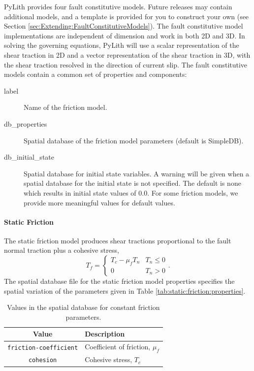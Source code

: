 PyLith provides four fault constitutive models. Future releases may
contain additional models, and a template is provided for you to construct
your own (see Section \vref{sec:Extending:FaultConstitutiveModels}).
The fault constitutive model implementations are independent of dimension
and work in both 2D and 3D. In solving the governing equations, PyLith
will use a scalar representation of the shear traction in 2D and a
vector representation of the shear traction in 3D, with the shear
traction resolved in the direction of current slip. The fault constitutive
models contain a common set of properties and components:
\begin{description}
\item [{label}] Name of the friction model.
\item [{db\_properties}] Spatial database of the friction model parameters
(default is SimpleDB).
\item [{db\_initial\_state}] Spatial database for initial state variables.
A warning will be given when a spatial database for the initial state
is not specified. The default is none which results in initial state
values of 0.0. For some friction models, we provide more meaningful
values for default values.
\end{description}

\paragraph{Static Friction}

The static friction model produces shear tractions proportional to
the fault normal traction plus a cohesive stress,
\begin{equation}
T_{f}=\begin{cases}
T_{c}-\mu_{f}T_{n} & T_{n}\leq0\\
0 & T_{n}>0
\end{cases}.
\end{equation}
The spatial database file for the static friction model properties
specifies the spatial variation of the parameters given in Table \vref{tab:static:friction:properties}.

\noindent \begin{center}
\begin{table}[H]
\noindent \centering{}\caption{\label{tab:static:friction:properties}Values in the spatial database
for constant friction parameters.}
\medskip{}
\begin{tabular}{|c|>{\raggedright}p{2.5in}|}
\hline 
\textbf{Value} & \centering{}\textbf{Description}\tabularnewline
\hline 
\hline 
\texttt{friction-coefficient} & \centering{}Coefficient of friction, $\mu_{f}$\tabularnewline
\hline 
\texttt{cohesion} & \centering{}Cohesive stress, $T_{c}$\tabularnewline
\hline 
\end{tabular}
\end{table}

\par\end{center}



